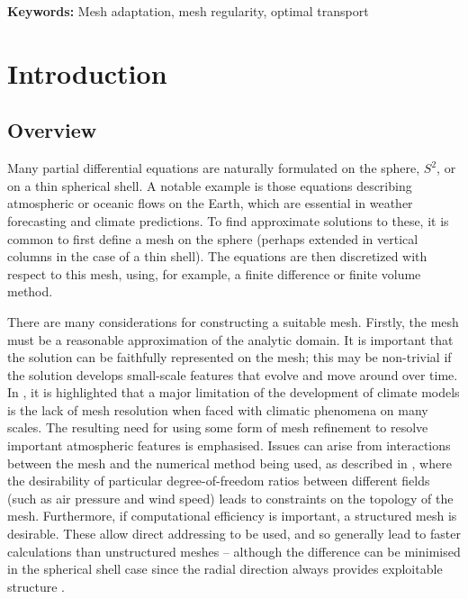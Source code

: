 \documentclass[11pt, a4paper]{scrartcl}  %
\theoremstyle{plain}
\theoremstyle{definition}
\numberwithin{equation}{section}
\begin{document}
\textbf{Keywords:} Mesh adaptation, mesh regularity, optimal transport

\section{Introduction}
\label{sec:Intro}

\subsection{Overview}

Many partial differential equations are naturally formulated on the
sphere, $S^2$, or on a thin spherical shell. A notable example is those
equations describing atmospheric or oceanic flows on the Earth, which
are essential in weather forecasting and climate predictions. To find
approximate solutions to these, it is common to first define a mesh on
the sphere (perhaps extended in vertical columns in the case of a thin
shell). The equations are then discretized with respect to this mesh,
using, for example, a finite difference or finite volume method.

There are many considerations for constructing a suitable mesh. Firstly,
the mesh must be a reasonable approximation of the analytic domain. It
is important that the solution can be faithfully represented on the
mesh; this may be non-trivial if the solution develops small-scale
features that evolve and move around over time. In
\citet{slingo2009developing}, it is highlighted that a major limitation
of the development of climate models is the lack of mesh resolution when
faced with climatic phenomena on many scales. The resulting need for
using some form of mesh refinement to resolve important atmospheric
features is emphasised. Issues can arise from interactions between the
mesh and the numerical method being used, as described in
\citet{staniforth2012horizontal}, where the desirability of particular
degree-of-freedom ratios between different fields (such as air pressure
and wind speed) leads to constraints on the topology of the mesh.
Furthermore, if computational efficiency is important, a structured mesh
is desirable. These allow direct addressing to be used, and so generally
lead to faster calculations than unstructured meshes -- although the
difference can be minimised in the spherical shell case since the radial
direction always provides exploitable structure
\citep{macdonald2010general,bercea2016structure}.
\end{document}
